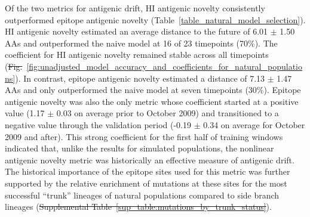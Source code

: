 \documentclass[9pt,lineno]{elife} %
\providecommand{\DIFadd}[1]{{\protect\color{blue}\uwave{#1}}} %
\providecommand{\DIFdel}[1]{{\protect\color{red}\sout{#1}}}                      %
\providecommand{\DIFaddbegin}{} %
\providecommand{\DIFaddend}{} %
\providecommand{\DIFdelbegin}{} %
\providecommand{\DIFdelend}{} %
\providecommand{\DIFaddtex}[1]{{\protect\color{blue}\uwave{#1}}} %
\providecommand{\DIFdeltex}[1]{{\protect\color{red}\sout{#1}}}                      %
\providecommand{\DIFaddbegin}{} %
\providecommand{\DIFaddend}{} %
\providecommand{\DIFdelbegin}{} %
\providecommand{\DIFdelend}{} %
\providecommand{\DIFadd}[1]{\texorpdfstring{\DIFaddtex{#1}}{#1}} %
\providecommand{\DIFdel}[1]{\texorpdfstring{\DIFdeltex{#1}}{}} %
\newcommand{\DIFscaledelfig}{0.5}
\newlength{\DIFdelgraphicswidth} %
\newlength{\DIFdelgraphicsheight} %
\newcommand{\DIFaddincludegraphics}[2][]{{\color{blue}\fbox{\DIFOincludegraphics[#1]{#2}}}} %
\newcommand{\DIFdelincludegraphics}[2][]{%
\sbox{\DIFdelgraphicsbox}{\DIFOincludegraphics[#1]{#2}}%
\settoboxwidth{\DIFdelgraphicswidth}{\DIFdelgraphicsbox} %
\settoboxtotalheight{\DIFdelgraphicsheight}{\DIFdelgraphicsbox} %
\scalebox{\DIFscaledelfig}{%
\parbox[b]{\DIFdelgraphicswidth}{\usebox{\DIFdelgraphicsbox}\\[-\baselineskip] \rule{\DIFdelgraphicswidth}{0em}}\llap{\resizebox{\DIFdelgraphicswidth}{\DIFdelgraphicsheight}{%
\setlength{\unitlength}{\DIFdelgraphicswidth}%
\begin{picture}(1,1)%
\thicklines\linethickness{2pt} %
{\color[rgb]{1,0,0}\put(0,0){\framebox(1,1){}}}%
{\color[rgb]{1,0,0}\put(0,0){\line( 1,1){1}}}%
{\color[rgb]{1,0,0}\put(0,1){\line(1,-1){1}}}%
\end{picture}%
}\hspace*{3pt}}} %
} %
\DeclareRobustCommand{\DIFaddbegin}{\DIFOaddbegin \let\includegraphics\DIFaddincludegraphics} %
\DeclareRobustCommand{\DIFaddend}{\DIFOaddend \let\includegraphics\DIFOincludegraphics} %
\DeclareRobustCommand{\DIFdelbegin}{\DIFOdelbegin \let\includegraphics\DIFdelincludegraphics} %
\DeclareRobustCommand{\DIFdelend}{\DIFOaddend \let\includegraphics\DIFOincludegraphics} %
\begin{document}
Of the two metrics for antigenic drift, HI antigenic novelty consistently outperformed epitope antigenic novelty (Table~\ref{table_natural_model_selection}).
HI antigenic novelty estimated an average distance to the future of 6.01 $\pm$ 1.50 AAs and outperformed the naive model at 16 of 23 timepoints (70\%).
The coefficient for HI antigenic novelty remained stable across all timepoints (\DIFdelbegin \DIFdel{Fig.}\DIFdelend \DIFaddbegin \DIFadd{Figure}\DIFaddend ~\ref{fig:unadjusted_model_accuracy_and_coefficients_for_natural_populations}).
In contrast, epitope antigenic novelty estimated a distance of 7.13 $\pm$ 1.47 AAs and only outperformed the naive model at seven timepoints (30\%).
Epitope antigenic novelty was also the only metric whose coefficient started at a positive value (1.17 $\pm$ 0.03 on average prior to October 2009) and transitioned to a negative value through the validation period (-0.19 $\pm$ 0.34 on average for October 2009 and after).
This strong coefficient for the first half of training windows indicated that, unlike the results for simulated populations, the nonlinear antigenic novelty metric was historically an effective measure of antigenic drift.
The historical importance of the epitope sites used for this metric was further supported by the relative enrichment of mutations at these sites for the most successful ``trunk'' lineages of natural populations compared to side branch lineages (\DIFdelbegin \DIFdel{Supplemental Table~\ref{sup_table:mutations_by_trunk_status}}\DIFdelend \DIFaddbegin \DIFadd{Table~\ref{table:mutations_by_trunk_status}}\DIFaddend ).
\end{document}
